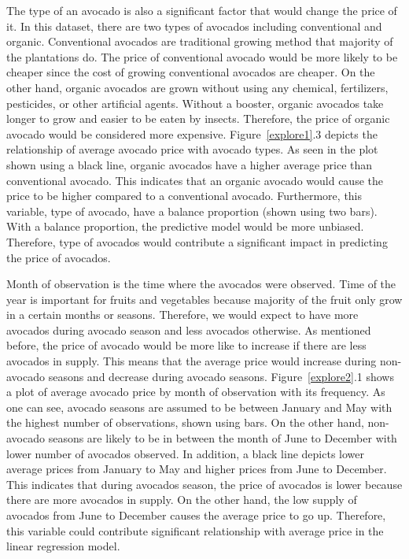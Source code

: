 \documentclass[11pt]{article}\usepackage[]{graphicx}\usepackage[]{color}
\begin{document}
\noindent The type of an avocado is also a significant factor that would change the price of it. In this dataset, there are two types of avocados including conventional and organic. Conventional avocados are traditional growing method that majority of the plantations do. The price of conventional avocado would be more likely to be cheaper since the cost of growing conventional avocados are cheaper. On the other hand, organic avocados are grown without using any chemical, fertilizers, pesticides, or other artificial agents. Without a booster, organic avocados take longer to grow and easier to be eaten by insects. Therefore, the price of organic avocado would be considered more expensive. Figure~\ref{explore1}.3 depicts the relationship of average avocado price with avocado types. As seen in the plot shown using a black line, organic avocados have a higher average price than conventional avocado. This indicates that an organic avocado would cause the price to be higher compared to a conventional avocado. Furthermore, this variable, type of avocado, have a balance proportion (shown using two bars). With a balance proportion, the predictive model would be more unbiased. Therefore, type of avocados would contribute a significant impact in predicting the price of avocados.      
\hfill \break

\noindent Month of observation is the time where the avocados were observed. Time of the year is important for fruits and vegetables because majority of the fruit only grow in a certain months or seasons. Therefore, we would expect to have more avocados during avocado season and less avocados otherwise. As mentioned before, the price of avocado would be more like to increase if there are less avocados in supply. This means that the average price would increase during non-avocado seasons and decrease during avocado seasons. Figure~\ref{explore2}.1 shows a plot of average avocado price by month of observation with its frequency. As one can see, avocado seasons are assumed to be between January and May with the highest number of observations, shown using bars. On the other hand, non-avocado seasons are likely to be in between the month of June to December with lower number of avocados observed. In addition, a black line depicts lower average prices from January to May and higher prices from June to December. This indicates that during avocados season, the price of avocados is lower because there are more avocados in supply. On the other hand, the low supply of avocados from June to December causes the average price to go up. Therefore, this variable could contribute significant relationship with average price in the linear regression model.
\hfill \break
\end{document}
